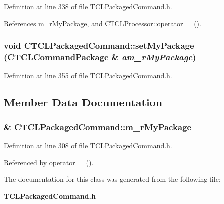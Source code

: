 Definition at line 338 of file TCLPackaged\-Command.h.

References m\_\-r\-My\-Package, and CTCLProcessor::operator==().
\subsubsection{\setlength{\rightskip}{0pt plus 5cm}void CTCLPackaged\-Command::set\-My\-Package ({\bf CTCLCommand\-Package} \& {\em am\_\-r\-My\-Package})\hspace{0.3cm}{\tt  [inline]}}\label{classCTCLPackagedCommand_a5}




Definition at line 355 of file TCLPackaged\-Command.h.

\subsection{Member Data Documentation}
\subsubsection{\& CTCLPackaged\-Command::m\_\-r\-My\-Package\hspace{0.3cm}{\tt  [private]}}\label{classCTCLPackagedCommand_o0}




Definition at line 308 of file TCLPackaged\-Command.h.

Referenced by operator==().

The documentation for this class was generated from the following file:\begin{CompactItemize}
\item 
{\bf TCLPackaged\-Command.h}\end{CompactItemize}

